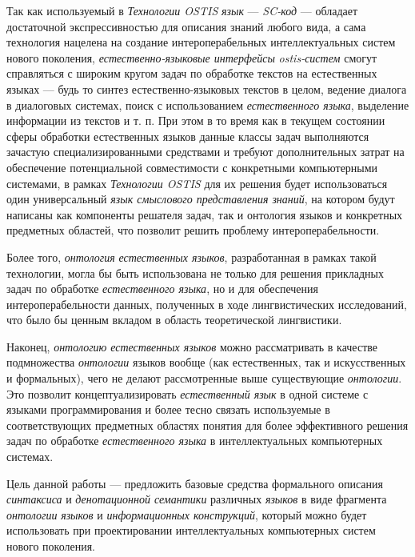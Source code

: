 Так как используемый в \textit{Технологии OSTIS} \textit{язык} --- \textit{SC-код} --- обладает достаточной экспрессивностью для описания знаний любого вида, а сама технология нацелена на создание интероперабельных интеллектуальных систем нового поколения, \textit{естественно-языковые интерфейсы} \textit{ostis-систем} смогут справляться с широким кругом задач по обработке текстов на естественных языках --- будь то синтез естественно-языковых текстов в целом, ведение диалога в диалоговых системах, поиск с использованием \textit{естественного языка}, выделение информации из текстов и т. п.
При этом в то время как в текущем состоянии сферы обработки естественных языков данные классы задач выполняются зачастую специализированными средствами и требуют дополнительных затрат на обеспечение потенциальной совместимости с конкретными компьютерными системами, в рамках \textit{Технологии OSTIS} для их решения будет использоваться один универсальный \textit{язык смыслового представления знаний}, на котором будут написаны как компоненты решателя задач, так и онтология языков и конкретных предметных областей, что позволит решить проблему интероперабельности.

Более того, \textit{онтология} \textit{естественных языков}, разработанная в рамках такой технологии, могла бы быть использована не только для решения прикладных задач по обработке \textit{естественного языка}, но и для обеспечения интероперабельности данных, полученных в ходе лингвистических исследований, что было бы ценным вкладом в область теоретической лингвистики.

Наконец, \textit{онтологию} \textit{естественных языков} можно рассматривать в качестве подмножества \textit{онтологии} языков вообще (как естественных, так и искусственных и формальных), чего не делают рассмотренные выше существующие \textit{онтологии}.
Это позволит концептуализировать \textit{естественный язык} в одной системе с языками программирования и более тесно связать используемые в соответствующих предметных областях понятия для более эффективного решения задач по обработке \textit{естественного языка} в интеллектуальных компьютерных системах.

Цель данной работы --- предложить базовые средства формального описания \textit{синтаксиса} и \textit{денотационной семантики} различных \textit{языков} в виде фрагмента \textit{онтологии} \textit{языков} и \textit{информационных конструкций}, который можно будет использовать при проектировании интеллектуальных компьютерных систем нового поколения.

